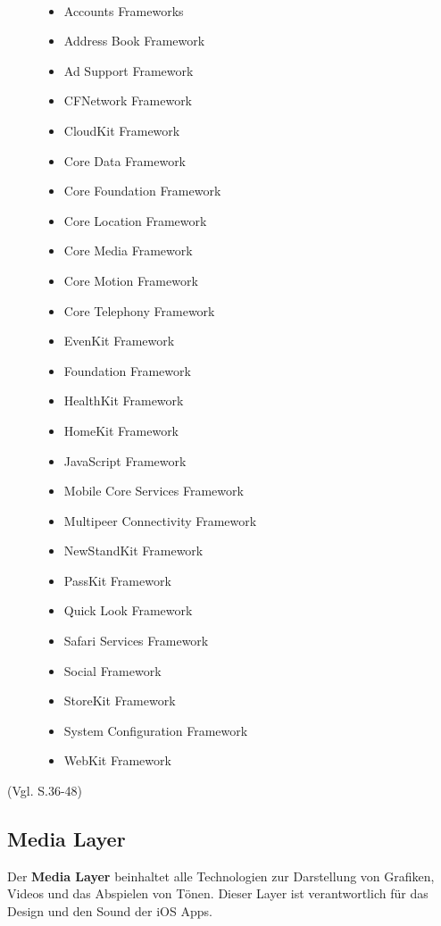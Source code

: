 \newpage
\begin{description}	
	\item[\parbox{\textwidth} {Das Core Service Layer Framework beinhaltet folgende Frameworks}]~\par
	\begin{multicols}{2}
	\begin{itemize}
		\item Accounts Frameworks
		\item Address Book Framework
		\item Ad Support Framework
		\item CFNetwork Framework
		\item CloudKit Framework
		\item Core Data Framework
		\item Core Foundation Framework
		\item Core Location Framework
		\item Core Media Framework
		\item Core Motion Framework
		\item Core Telephony Framework
		\item EvenKit Framework
		\item Foundation Framework
		\item HealthKit Framework
		\item HomeKit Framework
		\item JavaScript Framework
		\item Mobile Core Services Framework
		\item Multipeer Connectivity Framework
		\item NewStandKit Framework
		\item PassKit Framework
		\item Quick Look Framework
		\item Safari Services Framework
		\item Social Framework
		\item StoreKit Framework
		\item System Configuration Framework
		\item WebKit Framework
	\end{itemize}
	\end{multicols}
\end{description}
(Vgl. \cite{Apple[6]} S.36-48)
\subsection{Media Layer}
\label{sec:MediaLayer}		
Der \textbf{Media Layer} beinhaltet alle Technologien zur Darstellung von Grafiken, Videos und das Abspielen von Tönen. Dieser Layer ist verantwortlich für das Design und den Sound der iOS Apps. 


